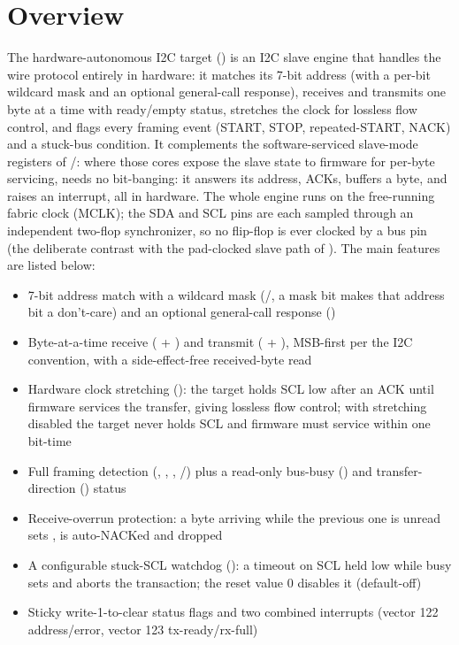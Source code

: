 \section{Overview}

The hardware-autonomous I2C target () is an I2C slave engine that handles the wire protocol entirely in hardware: it matches its 7-bit address (with a per-bit wildcard mask and an optional general-call response), receives and transmits one byte at a time with ready/empty status, stretches the clock for lossless flow control, and flags every framing event (START, STOP, repeated-START, NACK) and a stuck-bus condition. It complements the software-serviced slave-mode registers of /: where those cores expose the slave state to firmware for per-byte servicing,  needs no bit-banging: it answers its address, ACKs, buffers a byte, and raises an interrupt, all in hardware. The whole engine runs on the free-running fabric clock (MCLK); the SDA and SCL pins are each sampled through an independent two-flop synchronizer, so no flip-flop is ever clocked by a bus pin (the deliberate contrast with the pad-clocked slave path of ). The main features are listed below:

\begin{itemize}
	\item 7-bit address match with a wildcard mask (/, a mask bit makes that address bit a don't-care) and an optional general-call response ()
	\item Byte-at-a-time receive ( + ) and transmit ( + ), MSB-first per the I2C convention, with a side-effect-free received-byte read
	\item Hardware clock stretching (): the target holds SCL low after an ACK until firmware services the transfer, giving lossless flow control; with stretching disabled the target never holds SCL and firmware must service within one bit-time
	\item Full framing detection (, , , /) plus a read-only bus-busy () and transfer-direction () status
	\item Receive-overrun protection: a byte arriving while the previous one is unread sets , is auto-NACKed and dropped
	\item A configurable stuck-SCL watchdog (): a timeout on SCL held low while busy sets  and aborts the transaction; the reset value 0 disables it (default-off)
	\item Sticky write-1-to-clear status flags and two combined interrupts (vector 122 address/error, vector 123 tx-ready/rx-full)
\end{itemize}

